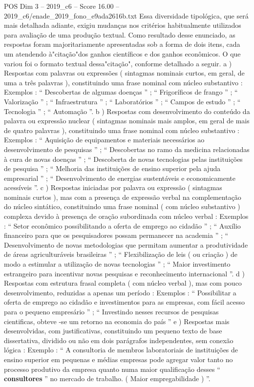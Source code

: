 \begin{textsample}{POS Dim 3 – 2019\_c6 – Score 16.00 – 2019\_c6/enade\_2019\_fono\_e9ada2616b.txt}
Essa diversidade tipológica, que será mais detalhada adiante, exigiu mudanças nos critérios habitualmente utilizados para avaliação de uma produção textual.
Como resultado desse enunciado, as respostas foram majoritariamente apresentadas sob a forma de dois itens, cada um atendendo à"citação"dos ganhos científicos e dos ganhos econômicos.
O que variou foi o formato textual dessa"citação", conforme detalhado a seguir. a ) Respostas com palavras ou expressões ( sintagmas nominais curtos, em geral, de uma a três palavras ), constituindo uma frase nominal com núcleo substantivo : Exemplos : “ Descobertas de algumas doenças ” ; “ Frigoríficos de frango ” ; “ Valorização ” ; “ Infraestrutura ” ; “ Laboratórios ” ; “ Campos de estudo ” ; “ Tecnologia ” ; “ Automação ”. b ) Respostas com desenvolvimento do conteúdo da palavra ou expressão nuclear ( sintagmas nominais mais amplos, em geral de mais de quatro palavras ), constituindo uma frase nominal com núcleo substantivo : Exemplos : “ Aquisição de equipamentos e materiais necessários ao desenvolvimento de pesquisas ” ; “ Descobertas no ramo da medicina relacionadas à cura de novas doenças ” ; “ Descoberta de novas tecnologias pelas instituições de pesquisa ” ; “ Melhoria das instituições de ensino superior pela ajuda empresarial ” ; “ Desenvolvimento de energias sustentáveis e economicamente acessíveis ”. c ) Respostas iniciadas por palavra ou expressão ( sintagmas nominais curtos ), mas com a presença de expressão verbal na complementação do núcleo sintático, constituindo uma frase nominal ( com núcleo substantivo ) complexa devido à presença de oração subordinada com núcleo verbal : Exemplos : “ Setor econômico possibilitando a oferta de emprego ao cidadão ” ; “ Auxílio financeiro para que os pesquisadores possam permanecer na academia ” ; “ Desenvolvimento de novas metodologias que permitam aumentar a produtividade de áreas agriculturáveis brasileiras ” ; “ Flexibilização de leis ( ou criação ) de modo a estimular a utilização de novas tecnologias ” ; “ Maior investimento estrangeiro para incentivar novas pesquisas e reconhecimento internacional ”. d ) Respostas com estrutura frasal completa ( com núcleo verbal ), mas com pouco desenvolvimento, reduzidas a apenas um período : Exemplos : “ Possibilitar a oferta de emprego ao cidadão e investimentos para as empresas, com fácil acesso para o pequeno empresário ” ; “ Investindo nesses recursos de pesquisas cientificas, obteve -se um retorno na economia do país ” e ) Respostas mais desenvolvidas, com justificativas, constituindo um pequeno texto de base dissertativa, dividido ou não em dois parágrafos independentes, sem conexão lógica : Exemplo : “ A consultoria de membros laboratoriais de instituições de ensino superior em pequenas e médias empresas pode agregar valor tanto no processo produtivo da empresa quanto numa maior qualificação desses “ \textbf{consultores} ” no mercado de trabalho. ( Maior empregabilidade ) ”.

\end{textsample}
